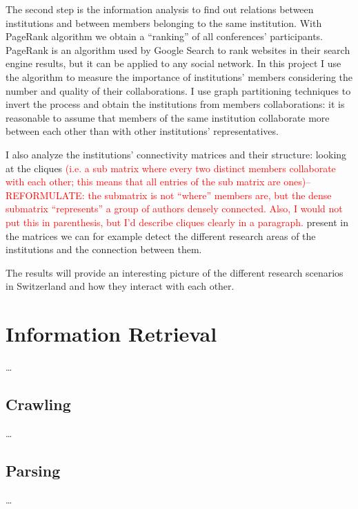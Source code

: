 \documentclass[]{usiinfbachelorproject}
\begin{document}
The second step is the information analysis to find out relations between institutions and between members belonging to the same institution. With PageRank algorithm we obtain a ``ranking'' of all conferences' participants.
PageRank is an algorithm used by Google Search to rank websites in their search engine results, but it can be applied to any social network. In this project I use the algorithm to measure the importance of institutions' members considering the number and quality of their collaborations. I use graph partitioning techniques to invert the process and obtain the institutions from members collaborations: it is reasonable to assume that members of the same institution collaborate more between each other than with other institutions' representatives.

I also analyze the institutions' connectivity matrices and their structure: looking at the cliques \textcolor{red}{(i.e. a sub matrix where every two distinct members collaborate with each other; this means that all entries of the sub matrix are ones)--REFORMULATE: the submatrix is not ``where'' members are, but the dense submatrix ``represents'' a group of authors densely connected. Also, I would not put this in parenthesis, but I'd describe cliques clearly in a paragraph.} present in the matrices we can for example detect the different research areas of the institutions and the connection between them.

The results will provide an interesting picture of the different research scenarios in Switzerland and how they interact with each other.






\section{Information Retrieval} \label{sec:inforetrieval} 

\ldots

\subsection{Crawling}

\ldots

\subsection{Parsing}

\ldots
\end{document}
